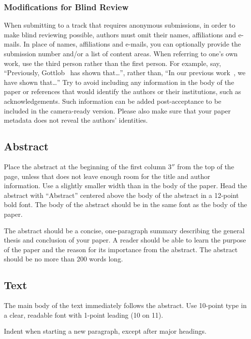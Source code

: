 \documentclass{article}
\begin{document}
\subsubsection{Modifications for Blind Review}
When submitting to a track that requires anonymous submissions,
in order to make blind reviewing possible, authors must omit their
names, affiliations and e-mails. In place
of names, affiliations and e-mails, you can optionally provide the submission number and/or
a list of content areas. When referring to one's own work,
use the third person rather than the
first person. For example, say, ``Previously,
Gottlob~ has shown that\ldots'', rather
than, ``In our previous work~\cite{gottlob:nonmon}, we have shown
that\ldots'' Try to avoid including any information in the body of the
paper or references that would identify the authors or their
institutions, such as acknowledgements. Such information can be added post-acceptance to be included in the camera-ready
version.
Please also make sure that your paper metadata does not reveal
the authors' identities.

\subsection{Abstract}

Place the abstract at the beginning of the first column 3$''$ from the
top of the page, unless that does not leave enough room for the title
and author information. Use a slightly smaller width than in the body
of the paper. Head the abstract with ``Abstract'' centered above the
body of the abstract in a 12-point bold font. The body of the abstract
should be in the same font as the body of the paper.

The abstract should be a concise, one-paragraph summary describing the
general thesis and conclusion of your paper. A reader should be able
to learn the purpose of the paper and the reason for its importance
from the abstract. The abstract should be no more than 200 words long.

\subsection{Text}

The main body of the text immediately follows the abstract. Use
10-point type in a clear, readable font with 1-point leading (10 on
11).

Indent when starting a new paragraph, except after major headings.
\end{document}

